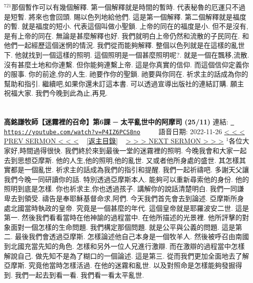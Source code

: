 \documentclass{book}
\begin{document}
$^{721}$那個暫作可以有幾個解釋.
第一個解釋就是時間的暫時.
代表秘魯的厄運只不過是短暫.
將來也會回頭.
賜以色列地給他們.
這是第一個解釋.
第二個解釋就是福度的暫.
就是福度的短小.
代表這個叫做小聖鎖.
上帝的同在的福度是小.
但不是沒有,是有上帝的同在.
無論是甚麼解釋也好.
我們就明白上帝仍然和流散的子民同在.
和他們一起經歷這個迷惘的情況.
我們從而能夠解釋.
整個以色列就是在這樣的亂世下.
他就找到一個這樣的照明.
這個照明是一個甚麼照明呢?.
就是一個在飄移,流散.
沒有甚麼土地和你連繫.
但你能夠連繫上帝.
這是你真實的信仰.
而這個信仰定義你的服事.
你的前途,你的人生.
祂要作你的聖鎖.
祂要與你同在.
祈求主的話成為你的幫助和指引.
繼續吧,如果你還未訂這本書.
可以透過宣導出版社的連結訂購.
願主祝福大家.
我們今晚到此為止,再見.
\newpage



\section{}
\label{sec:P4IZ6PCS8no}
\textbf{高銘謙牧師【迷霧裡的召命】第6課 ─ 太平亂世中的阿摩司 (25/11)}
\newline
\newline
連結: \href{https://youtube.com/watch?v=P4IZ6PCS8no}{\texttt{ https://youtube.com/watch?v=P4IZ6PCS8no}} ~~~~ 語音日期: 2022-11-26 
\newline
\newline
\hyperref[sec:FHx_k0UyGMs]{\small{< < < PREV SERMON < < <}}
~
\hyperref[sec:index]{\small{[返主目錄]}}
~
\hyperref[sec:code]{\small{> > > NEXT SERMON > > >}}
\newline
\newline
$^{1}$各位大家好,時間過得很快.
我們終於來到最後一堂的迷霧裡的照明.
今晚我會和大家一起去到思想亞摩斯.
他的人生,他的照明,他的亂世.
又或者他所身處的盛世.
其怎樣其實都是一個亂世.
祈求主的話成為我們的指引和提醒.
我們一起祈禱吧.
多謝天父讓我們今晚一同研讀你的話.
特別透過亞摩斯本人.
能夠可以重新尋索他的身份.
他的照明到底是怎樣.
你也祈求主,你也透過孩子.
講解你的說話清楚明白.
我們一同謙卑去到領受.
禱告是奉耶穌基督命求,阿們.
今天我們首先會去到論述.
亞摩斯所身處北國當時執政的皇帝.
究竟是一個甚麼的年代.
這個皇帝就是耶羅波安二世.
這是第一.
然後我們看看當時在他神諭的過程當中.
在他所描述的光景裡.
他所評擊的對象面對一個怎樣的生命問題.
我們構定那個問題.
就是公平與公義的問題.
這是第二.
最後我們會透過亞摩斯.
怎樣論述他自己本身是一個牧羊人.
然後被呼召由南國到北國充當先知的角色.
怎樣和另外一位人兄進行激辯.
而在激辯的過程當中怎樣解說自己.
做先知不是為了糊口的一個論述.
這是第三.
從而我們更加全面地去了解亞摩斯.
究竟他當時怎樣活過.
在他的迷霧和亂世.
以及對照命是怎樣能夠發掘得到.
我們一起去到看一看.
我們看一看太平亂世.
\end{document}
